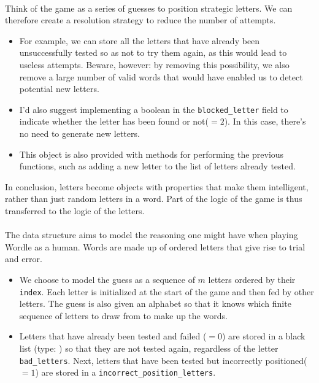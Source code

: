 \documentclass[10pt,a4paper,hidelinks]{article}
\begin{document}
\paragraph{} Think of the game as a series of guesses to position strategic letters. We can therefore create a resolution strategy to reduce the number of attempts.
\begin{itemize}
    \item For example, we can store all the letters that have already been unsuccessfully tested so as not to try them again, as this would lead to useless attempts. Beware, however: by removing this possibility, we also remove a large number of valid words that would have enabled us to detect potential new letters.
    \item I'd also suggest implementing a boolean in the \verb|blocked_letter| field to indicate whether the letter has been found or not($=2$). In this case, there's no need to generate new letters.
\end{itemize}


\begin{itemize}
    \item This object is also provided with methods for performing the previous functions, such as adding a new letter to the list of letters already tested.
\end{itemize}

In conclusion, letters become objects with properties that make them intelligent, rather than just random letters in a word. Part of the logic of the game is thus transferred to the logic of the letters.


\paragraph{} The data structure aims to model the reasoning one might have when playing Wordle as a human. Words are made up of ordered letters that give rise to trial and error.
\begin{itemize}
    \item We choose to model the guess as a sequence of $m$ letters ordered by their \verb|index|. Each letter is initialized at the start of the game and then fed by other letters. The guess is also given an alphabet so that it knows which finite sequence of letters to draw from to make up the words.
    \item Letters that have already been tested and failed ($=0$) are stored in a black list (type: ) so that they are not tested again, regardless of the letter \verb|bad_letters|. Next, letters that have been tested but incorrectly positioned($=1$) are stored in a  \verb|incorrect_position_letters|.
\end{itemize}

\end{document}
